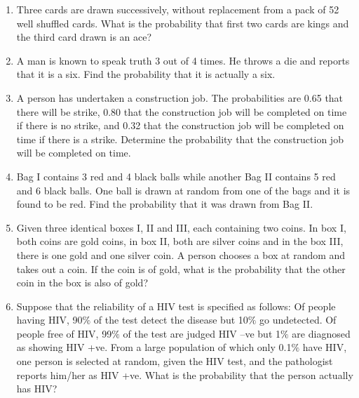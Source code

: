 \begin{enumerate}[label=\thesection.\arabic*.,ref=\thesection.\theenumi]
\item Three cards are drawn successively, without replacement from a pack of 52 well shuffled cards. What is the probability that first two cards are kings and the third card drawn is an ace?\\

\item A man is known to speak truth 3 out of 4 times. He throws a die and reports that it is a six. Find the probability that it is actually a six.\\
\solution


\item A person has undertaken a construction job. The probabilities are 0.65 that there will be strike, 0.80 that the construction job will be completed on time if there is no strike, and 0.32 that the construction job will be completed on time if there is a strike. Determine the probability that the construction job will be completed on time.\\
\solution


\item Bag I contains 3 red and 4 black balls while another Bag II contains 5 red and 6 black balls. One ball is drawn at random from one of the bags and it is found to be red. Find the probability that it was drawn from Bag II.\\
\solution


\item Given three identical boxes I, II and III, each containing two coins. In box I, both coins are gold coins, in box II, both are silver coins and in the box III, there is one gold and one silver coin. A person chooses a box at random and takes out a coin. If the coin is of gold, what is the probability that the other coin in the box is also of gold?\\
\solution


\item Suppose that the reliability of a HIV test is specified as follows: Of people having HIV, 90$\%$ of the test detect the disease but 10$\%$ go undetected. Of people free of HIV, 99$\%$ of the test are judged HIV –ve but 1$\%$ are diagnosed as showing HIV +ve. From a large population of which only 0.1$\%$ have HIV, one person is selected at random, given the HIV test, and the pathologist reports him/her as HIV +ve. What is the probability that the person actually has HIV?\\
\solution



\end{enumerate}
